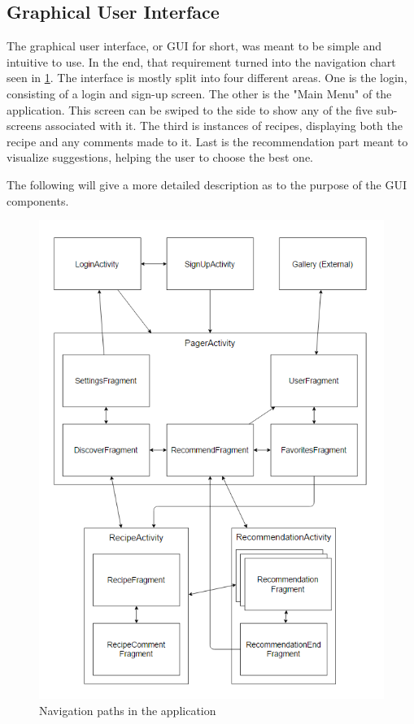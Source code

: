 \subsection{Graphical User Interface}
\label{subsec:gui}

The graphical user interface, or GUI for short, was meant to be simple and intuitive to use. In the end, that requirement turned into the navigation chart seen in \ref{fig:application_navigation}. The interface is mostly split into four different areas. One is the login, consisting of a login and sign-up screen. The other is the "Main Menu" of the application. This screen can be swiped to the side to show any of the five sub-screens associated with it. The third is instances of recipes, displaying both the recipe and any comments made to it. Last is the recommendation part meant to visualize suggestions, helping the user to choose the best one.

The following will give a more detailed description as to the purpose of the GUI components.

\begin{figure}[H]
	\centering
	\includegraphics[width=\textwidth]{Pictures/application_navigation.png}
	\caption{Navigation paths in the application}
	\label{fig:application_navigation}
\end{figure}

